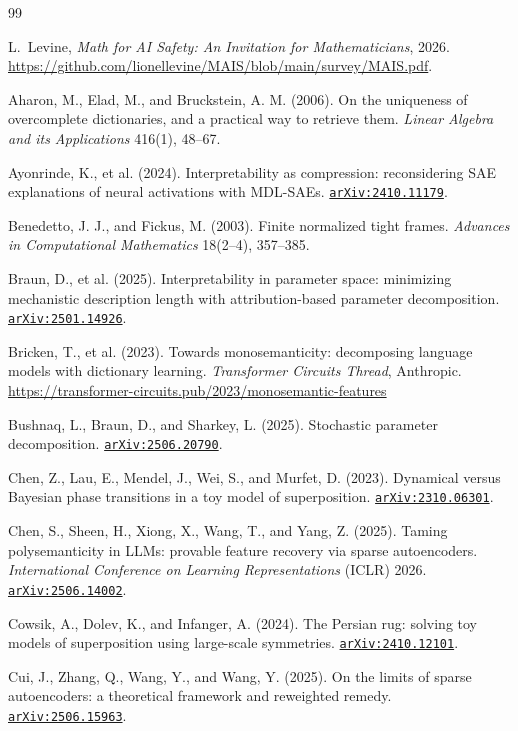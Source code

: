 \documentclass[11pt]{amsart}
\newcommand{\arxiv}[1]{\href{https://arxiv.org/abs/#1}{\texttt{arXiv:#1}}}
\theoremstyle{plain}
\theoremstyle{definition}
\begin{document}
\begin{thebibliography}{99}

L.~Levine,
\emph{Math for AI Safety: An Invitation for Mathematicians},
2026. \url{https://github.com/lionellevine/MAIS/blob/main/survey/MAIS.pdf}.


 Aharon, M., Elad, M., and Bruckstein, A. M. (2006). On the uniqueness of overcomplete dictionaries, and a practical way to retrieve them. \emph{Linear Algebra and its Applications} 416(1), 48--67.

 Ayonrinde, K., et al. (2024). Interpretability as compression: reconsidering SAE explanations of neural activations with MDL-SAEs. \arxiv{2410.11179}.

 Benedetto, J. J., and Fickus, M. (2003). Finite normalized tight frames. \emph{Advances in Computational Mathematics} 18(2--4), 357--385.

 Braun, D., et al. (2025). Interpretability in parameter space: minimizing mechanistic description length with attribution-based parameter decomposition. \arxiv{2501.14926}.

 Bricken, T., et al. (2023). Towards monosemanticity: decomposing language models with dictionary learning. \emph{Transformer Circuits Thread}, Anthropic. \url{https://transformer-circuits.pub/2023/monosemantic-features}

 Bushnaq, L., Braun, D., and Sharkey, L. (2025). Stochastic parameter decomposition. \arxiv{2506.20790}.

 Chen, Z., Lau, E., Mendel, J., Wei, S., and Murfet, D. (2023). Dynamical versus Bayesian phase transitions in a toy model of superposition. \arxiv{2310.06301}.

 Chen, S., Sheen, H., Xiong, X., Wang, T., and Yang, Z. (2025). Taming polysemanticity in LLMs: provable feature recovery via sparse autoencoders. \emph{International Conference on Learning Representations} (ICLR) 2026. \arxiv{2506.14002}.

 Cowsik, A., Dolev, K., and Infanger, A. (2024). The Persian rug: solving toy models of superposition using large-scale symmetries. \arxiv{2410.12101}.

 Cui, J., Zhang, Q., Wang, Y., and Wang, Y. (2025). On the limits of sparse autoencoders: a theoretical framework and reweighted remedy. \arxiv{2506.15963}.


\end{thebibliography}
\end{document}
